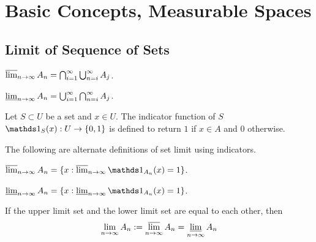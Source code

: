 \documentclass[class=book, crop=false]{standalone}
\begin{document}
    \section{Basic Concepts, Measurable Spaces}
        \subsection{Limit of Sequence of Sets}
        \begin{definition}
            $\varlimsup_{n \rightarrow \infty} A_n = \bigcap^{\infty}_{i = 1} \bigcup^{\infty}_{n = i} A_j$.
        \end{definition}
        
        \begin{definition}
            $\varliminf_{n \rightarrow \infty} A_n = \bigcup^{\infty}_{i = 1} \bigcap^{\infty}_{n = i} A_j$.
        \end{definition}
        
        \begin{definition}
            Let $S \subset U$ be a set and $x \in U$. The indicator function of $S$ $\indic_S(x) : U \rightarrow \{0, 1\}$ is defined to return $1$ if $x \in A$ and $0$ otherwise.
        \end{definition}
        
        \noindent The following are alternate definitions of set limit using indicators.
        \begin{theorem}
            $\varlimsup_{n \rightarrow \infty} A_n = \{x : \varlimsup_{n \rightarrow \infty} \indic_{A_n}(x) = 1\}$.
        \end{theorem}
        
        \begin{theorem}
            $\varliminf_{n \rightarrow \infty} A_n = \{x : \varliminf_{n \rightarrow \infty} \indic_{A_n}(x) = 1\}$.
        \end{theorem}

        \begin{theorem}[Existence of Limit for $\{A_n\}^{\infty}_{n = 1}$]
            If the upper limit set and the lower limit set are equal to each other, then
            \begin{equation*}
                \lim_{n \rightarrow \infty} A_n := \varlimsup_{n \rightarrow \infty} A_n = \varliminf_{n \rightarrow \infty} A_n
            \end{equation*}
        \end{theorem}
        
\end{document}
